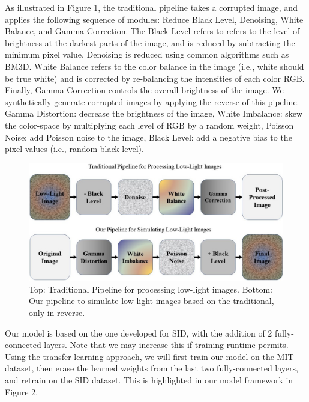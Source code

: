 \documentclass{article}
\begin{document}
As illustrated in Figure 1, the traditional pipeline takes a corrupted image, and applies the following sequence of modules: Reduce Black Level, Denoising, White Balance, and Gamma Correction. The Black Level refers to refers to the level of brightness at the darkest parts of the image, and is reduced by subtracting the minimum pixel value. Denoising is reduced using common algorithms such as BM3D. White Balance refers to the color balance in the image (i.e., white should be true white) and is corrected by re-balancing the intensities of each color RGB. Finally, Gamma Correction controls the overall brightness of the image. We synthetically generate corrupted images by applying the reverse of this pipeline. Gamma Distortion: decrease the brightness of the image, White Imbalance: skew the color-space by multiplying each level of RGB by a random weight, Poisson Noise: add Poisson noise to the image, Black Level: add a negative bias to the pixel values (i.e., random black level). 

\begin{figure}[ht]
  \centering
  \includegraphics[scale=0.35]{pipeline.jpg}
  \caption{Top: Traditional Pipeline for processing low-light images. Bottom: Our  pipeline to simulate low-light images based on the traditional, only in reverse.}
\end{figure}

Our model is based on the one developed for SID, with the addition of 2 fully-connected layers. Note that we may increase this if training runtime permits. Using the transfer learning approach, we will first train our model on the MIT dataset, then erase the learned weights from the last two fully-connected layers, and retrain on the SID dataset. This is highlighted in our model framework in Figure 2. 
\end{document}
